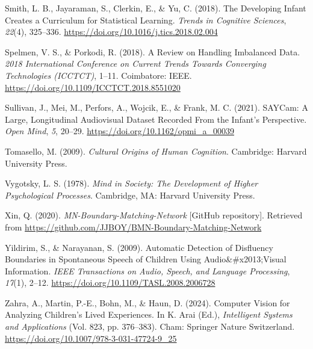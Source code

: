 \documentclass[
  man,floatsintext]{apa6}
\newlength{\cslhangindent}
\newenvironment{CSLReferences}[2] %
 {\begin{list}{}{%
  \setlength{\itemindent}{0pt}
  \setlength{\leftmargin}{0pt}
  \setlength{\parsep}{0pt}
  \ifodd #1
   \setlength{\leftmargin}{\cslhangindent}
   \setlength{\itemindent}{-1\cslhangindent}
  \fi
  \setlength{\itemsep}{#2\baselineskip}}}
 {\end{list}}
\begin{document}
\begin{CSLReferences}{1}{0}
Smith, L. B., Jayaraman, S., Clerkin, E., \& Yu, C. (2018). The {Developing Infant Creates} a {Curriculum} for {Statistical Learning}. \emph{Trends in Cognitive Sciences}, \emph{22}(4), 325--336. \url{https://doi.org/10.1016/j.tics.2018.02.004}

Spelmen, V. S., \& Porkodi, R. (2018). A {Review} on {Handling Imbalanced Data}. \emph{2018 {International Conference} on {Current Trends} Towards {Converging Technologies} ({ICCTCT})}, 1--11. Coimbatore: IEEE. \url{https://doi.org/10.1109/ICCTCT.2018.8551020}

Sullivan, J., Mei, M., Perfors, A., Wojcik, E., \& Frank, M. C. (2021). {SAYCam}: {A Large}, {Longitudinal Audiovisual Dataset Recorded From} the {Infant}'s {Perspective}. \emph{Open Mind}, \emph{5}, 20--29. \url{https://doi.org/10.1162/opmi_a_00039}

Tomasello, M. (2009). \emph{Cultural {Origins} of {Human Cognition}}. Cambridge: Harvard University Press.

Vygotsky, L. S. (1978). \emph{Mind in {Society}: {The Development} of {Higher Psychological Processes}}. Cambridge, MA: Harvard University Press.

Xin, Q. (2020). \emph{{MN-Boundary-Matching-Network}} {[}GitHub repository{]}. Retrieved from \url{https://github.com/JJBOY/BMN-Boundary-Matching-Network}

Yildirim, S., \& Narayanan, S. (2009). Automatic {Detection} of {Disfluency Boundaries} in {Spontaneous Speech} of {Children Using Audio}\&\#x2013;{Visual Information}. \emph{IEEE Transactions on Audio, Speech, and Language Processing}, \emph{17}(1), 2--12. \url{https://doi.org/10.1109/TASL.2008.2006728}

Zahra, A., Martin, P.-E., Bohn, M., \& Haun, D. (2024). Computer {Vision} for {Analyzing Children}'s {Lived Experiences}. In K. Arai (Ed.), \emph{Intelligent {Systems} and {Applications}} (Vol. 823, pp. 376--383). Cham: Springer Nature Switzerland. \url{https://doi.org/10.1007/978-3-031-47724-9_25}

\end{CSLReferences}
\end{document}
